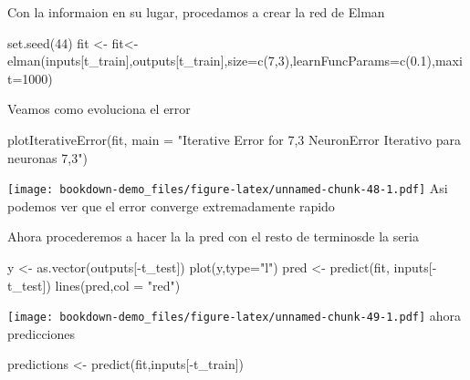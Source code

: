 \documentclass[
]{book}
\newenvironment{Shaded}{\begin{snugshade}}{\end{snugshade}}
\newcommand{\AttributeTok}[1]{\textcolor[rgb]{0.77,0.63,0.00}{#1}}
\newcommand{\DecValTok}[1]{\textcolor[rgb]{0.00,0.00,0.81}{#1}}
\newcommand{\FloatTok}[1]{\textcolor[rgb]{0.00,0.00,0.81}{#1}}
\newcommand{\FunctionTok}[1]{\textcolor[rgb]{0.00,0.00,0.00}{#1}}
\newcommand{\NormalTok}[1]{#1}
\newcommand{\OtherTok}[1]{\textcolor[rgb]{0.56,0.35,0.01}{#1}}
\newcommand{\SpecialCharTok}[1]{\textcolor[rgb]{0.00,0.00,0.00}{#1}}
\newcommand{\StringTok}[1]{\textcolor[rgb]{0.31,0.60,0.02}{#1}}
\begin{document}
Con la informaion en su lugar, procedamos a crear la red de Elman

\begin{Shaded}
\begin{Highlighting}[]
\FunctionTok{set.seed}\NormalTok{(}\DecValTok{44}\NormalTok{)}
\NormalTok{fit }\OtherTok{\textless{}{-}}\NormalTok{ fit}\OtherTok{\textless{}{-}}\FunctionTok{elman}\NormalTok{(inputs[t\_train],outputs[t\_train],}\AttributeTok{size=}\FunctionTok{c}\NormalTok{(}\DecValTok{7}\NormalTok{,}\DecValTok{3}\NormalTok{),}\AttributeTok{learnFuncParams=}\FunctionTok{c}\NormalTok{(}\FloatTok{0.1}\NormalTok{),}\AttributeTok{maxit=}\DecValTok{1000}\NormalTok{)}
\end{Highlighting}
\end{Shaded}

Veamos como evoluciona el error

\begin{Shaded}
\begin{Highlighting}[]
\FunctionTok{plotIterativeError}\NormalTok{(fit, }\AttributeTok{main =} \StringTok{"Iterative Error for 7,3 NeuronError Iterativo para neuronas 7,3"}\NormalTok{)}
\end{Highlighting}
\end{Shaded}

\texttt{[image: bookdown-demo\_files/figure-latex/unnamed-chunk-48-1.pdf]}
Asi podemos ver que el error converge extremadamente rapido

Ahora procederemos a hacer la la pred con el resto de terminosde la seria

\begin{Shaded}
\begin{Highlighting}[]
\NormalTok{y }\OtherTok{\textless{}{-}} \FunctionTok{as.vector}\NormalTok{(outputs[}\SpecialCharTok{{-}}\NormalTok{t\_test])}
\FunctionTok{plot}\NormalTok{(y,}\AttributeTok{type=}\StringTok{"l"}\NormalTok{)}
\NormalTok{pred }\OtherTok{\textless{}{-}} \FunctionTok{predict}\NormalTok{(fit, inputs[}\SpecialCharTok{{-}}\NormalTok{t\_test])}
\FunctionTok{lines}\NormalTok{(pred,}\AttributeTok{col =} \StringTok{"red"}\NormalTok{)}
\end{Highlighting}
\end{Shaded}

\texttt{[image: bookdown-demo\_files/figure-latex/unnamed-chunk-49-1.pdf]}
ahora predicciones

\begin{Shaded}
\begin{Highlighting}[]
\NormalTok{predictions }\OtherTok{\textless{}{-}} \FunctionTok{predict}\NormalTok{(fit,inputs[}\SpecialCharTok{{-}}\NormalTok{t\_train])}
\end{Highlighting}
\end{Shaded}
\end{document}
